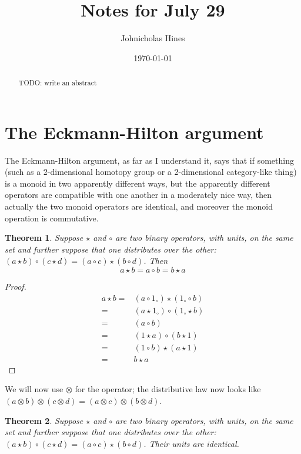 \documentclass[a4paper]{article}
\title{Notes for July 29}
\author{Johnicholas Hines}
\date{\today}
\newtheorem{theorem}{Theorem}
\begin{document}
\maketitle

\begin{abstract}
TODO: write an abstract
\end{abstract}


\section{The Eckmann-Hilton argument}

The Eckmann-Hilton argument, as far as I understand it, says that if something (such as a 2-dimensional homotopy group or a 2-dimensional category-like thing) is a monoid in two apparently different ways, but the apparently different operators are compatible with one another in a moderately nice way, then actually the two monoid operators are identical, and moreover the monoid operation is commutative.

\begin{theorem}
Suppose \( \star \) and \( \circ \) are two binary operators, with units, on the 
same set and further suppose that one distributes over the other: \( 
(a \star b) \circ (c \star d) = (a \circ c) \star (b \circ d) \). Then
\[
a \star  b = a \circ b = b \star a 
\]
\end{theorem}

\begin{proof}
  \begin{align*}
      a \star b = & (a \circ 1_\circ) \star (1_\circ \circ b) \\
      = & (a \star 1_\circ) \circ (1_\circ \star b) \\
      = & (a \circ b) \\
      = & (1 \star a) \circ (b \star 1) \\
      = & (1 \circ b) \star (a \star 1) \\
      = & b \star a
  \end{align*}
\end{proof}

We will now use \(\otimes\) for the operator; the distributive law now 
looks like \((a \otimes b) \otimes (c \otimes d) = (a \otimes c)
\otimes (b \otimes d)\).

\begin{theorem}
Suppose \( \star \) and \( \circ \) are two binary operators, with units, on the 
same set and further suppose that one distributes over the other:
\( (a \star b) \circ (c \star d) = (a \circ c) \star (b \circ d) \). 
Their units are identical.
\end{theorem}
\end{document}
